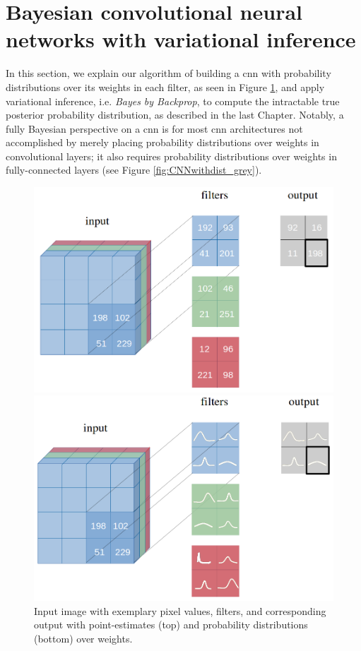 \section{Bayesian convolutional neural networks with variational inference}
In this section, we explain our algorithm of building a \ac{cnn} with probability distributions over its weights in each filter, as seen in Figure \ref{fig:filter_scalar}, and apply variational inference, i.e. \textit{Bayes by Backprop}, to compute the intractable true posterior probability distribution, as described in the last Chapter. Notably, a fully Bayesian perspective on a \ac{cnn} is for most \ac{cnn} architectures not accomplished by merely placing probability distributions over weights in convolutional layers; it also requires probability distributions over weights in fully-connected layers (see Figure \ref{fig:CNNwithdist_grey}). 
%
\begin{figure}[H] 
\centering
\begin{minipage}{.4\textwidth}
\centering
\includegraphics[width=\linewidth]{Chapter4/Figs/filter_scalars.png}
\end{minipage}
%
\begin{minipage}{.4\textwidth}
\centering
\includegraphics[width=\linewidth]{Chapter4/Figs/CNNwithdist.png}
\end{minipage}
\caption{Input image with exemplary pixel values, filters, and corresponding output with point-estimates (top) and probability distributions (bottom) over weights.}
\label{fig:filter_scalar}
\end{figure} 
